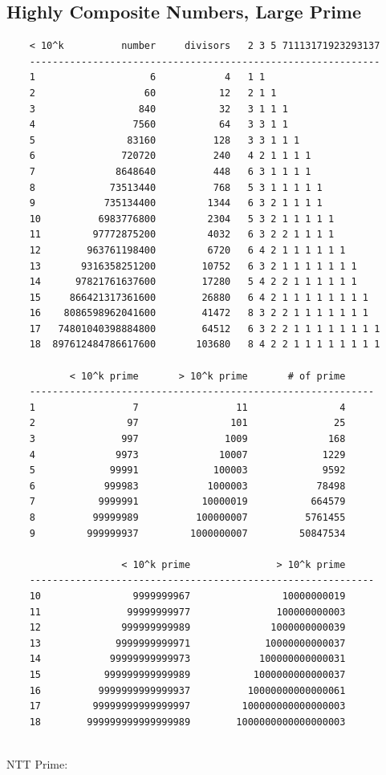 \documentclass[landscape, 8pt, a4paper, oneside, twocolumn]{extarticle}
\begin{document}
\subsection {Highly Composite Numbers, Large Prime}
\begin{verbatim}
    < 10^k          number     divisors   2 3 5 71113171923293137
    -------------------------------------------------------------
    1                    6            4   1 1
    2                   60           12   2 1 1
    3                  840           32   3 1 1 1
    4                 7560           64   3 3 1 1
    5                83160          128   3 3 1 1 1
    6               720720          240   4 2 1 1 1 1
    7              8648640          448   6 3 1 1 1 1
    8             73513440          768   5 3 1 1 1 1 1
    9            735134400         1344   6 3 2 1 1 1 1
    10          6983776800         2304   5 3 2 1 1 1 1 1
    11         97772875200         4032   6 3 2 2 1 1 1 1
    12        963761198400         6720   6 4 2 1 1 1 1 1 1
    13       9316358251200        10752   6 3 2 1 1 1 1 1 1 1
    14      97821761637600        17280   5 4 2 2 1 1 1 1 1 1
    15     866421317361600        26880   6 4 2 1 1 1 1 1 1 1 1
    16    8086598962041600        41472   8 3 2 2 1 1 1 1 1 1 1
    17   74801040398884800        64512   6 3 2 2 1 1 1 1 1 1 1 1
    18  897612484786617600       103680   8 4 2 2 1 1 1 1 1 1 1 1
    
           < 10^k prime       > 10^k prime       # of prime   
    ------------------------------------------------------------
    1                 7                 11                4    
    2                97                101               25    
    3               997               1009              168    
    4              9973              10007             1229    
    5             99991             100003             9592    
    6            999983            1000003            78498    
    7           9999991           10000019           664579     
    8          99999989          100000007          5761455     
    9         999999937         1000000007         50847534     
    
                    < 10^k prime               > 10^k prime
    ------------------------------------------------------------
    10                9999999967                10000000019
    11               99999999977               100000000003
    12              999999999989              1000000000039
    13             9999999999971             10000000000037
    14            99999999999973            100000000000031
    15           999999999999989           1000000000000037
    16          9999999999999937          10000000000000061
    17         99999999999999997         100000000000000003
    18        999999999999999989        1000000000000000003
    
\end{verbatim}
NTT Prime:
\end{document}
